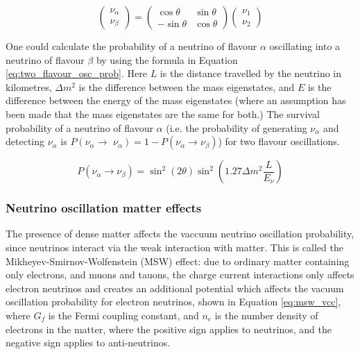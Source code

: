 $$
\left(\begin{array}{l}
\nu_{\alpha} \\
\nu_{\beta}
\end{array}\right)=\left(\begin{array}{cc}
\cos \theta & \sin \theta \\
-\sin \theta & \cos \theta
\end{array}\right)\left(\begin{array}{l}
\nu_{1} \\
\nu_{2}
\end{array}\right)
\label{eq:rotation matrix}
$$


One could calculate the probability of a neutrino of flavour $\alpha$ oscillating into a neutrino of flavour $\beta$ by using the formula in Equation \ref{eq:two_flavour_osc_prob}. Here $L$ is the distance travelled by the neutrino in kilometres, $\Delta m^{2}$ is the difference between the mass eigenstates, and $E$ is the difference between the energy of the mass eigenstates (where an assumption has been made that the mass eigenstates are the same for both.) The survival probability of a neutrino of flavour $\alpha$ (i.e. the probability of generating $\nu_{\alpha}$ and detecting $\nu_{\alpha}$ is $P\left(\nu_{\alpha} \rightarrow\right.$ $\left.\nu_{\alpha}\right)=1-P\left(\nu_{\alpha} \rightarrow \nu_{\beta}\right)$) for two flavour oscillations. 

\begin{equation}
P\left(\nu_{\alpha} \rightarrow \nu_{\beta}\right)=\sin ^{2}(2 \theta) \sin ^{2}\left(1.27 \Delta m^{2} \frac{L}{E_{\nu}}\right)
\label{eq:two_flavour_osc_prob}
\end{equation}

\subsubsection{Neutrino oscillation matter effects}

The presence of dense matter affects the vaccuum neutrino oscillation probability, since neutrinos interact via the weak interaction with matter. This is called the Mikheyev-Smirnov-Wolfenstein (MSW) effect: due to ordinary matter containing only electrons, and muons and tauons, the charge current interactions only affects electron neutrinos and creates an additional potential which affects the vacuum oscillation probability for electron neutrinos, shown in Equation \ref{eq:msw_vcc}, where $G_{f}$ is the Fermi coupling constant, and $n_{e}$ is the number density of electrons in the matter, where the positive sign applies to neutrinos, and the negative sign applies to anti-neutrinos. 


